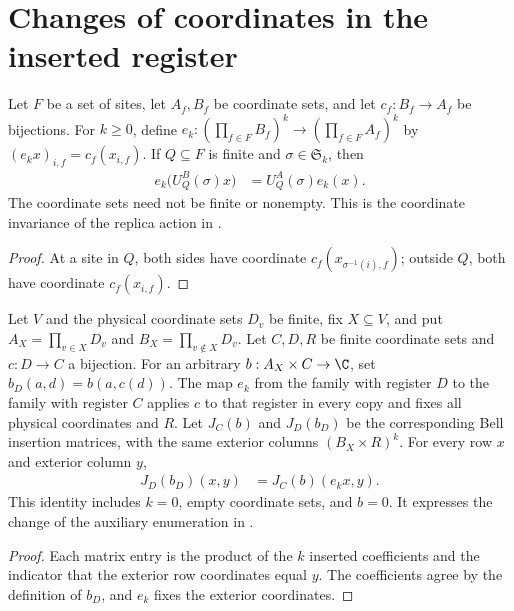 \section{Changes of coordinates in the inserted register}

\begin{theorem}
    \label{thm:subsystem_local_coordinate_change}
    \leanok
    Let $F$ be a set of sites, let $A_f,B_f$ be coordinate sets, and
    let $c_f:B_f\to A_f$ be bijections. For $k\geq0$, define
    $e_k:(\prod_{f\in F}B_f)^k\to(\prod_{f\in F}A_f)^k$ by
    $(e_kx)_{i,f}=c_f(x_{i,f})$.
    If $Q\subseteq F$ is finite and $\sigma\in\mathfrak S_k$, then
    \begin{align*}
        e_k\bigl(U_Q^B(\sigma)x\bigr)&=U_Q^A(\sigma)e_k(x).
    \end{align*}
    The coordinate sets need not be finite or nonempty.
    This is the coordinate invariance of the replica action in
    \cite[Section~6, lines~24--27]{OpenAI2026AreaLaw}.
\end{theorem}
\begin{proof}\leanok
    At a site in $Q$, both sides have coordinate
    $c_f(x_{\sigma^{-1}(i),f})$; outside $Q$, both have coordinate
    $c_f(x_{i,f})$.
\end{proof}

\begin{theorem}
    \label{thm:bell_insertion_register_coordinates}
    \leanok
    Let $V$ and the physical coordinate sets $D_v$ be finite, fix
    $X\subseteq V$, and put $A_X=\prod_{v\in X}D_v$ and
    $B_X=\prod_{v\notin X}D_v$.
    Let $C,D,R$ be finite coordinate sets and $c:D\to C$ a bijection.
    For an arbitrary $b:A_X\times C\to\C$, set $b_D(a,d)=b(a,c(d))$.
    The map $e_k$ from the family with register $D$ to the family with
    register $C$ applies $c$ to that register in every copy and fixes
    all physical coordinates and $R$.
    Let $J_C(b)$ and $J_D(b_D)$ be the corresponding Bell insertion
    matrices, with the same exterior columns $(B_X\times R)^k$.
    For every row $x$ and exterior column $y$,
    \begin{align*}
        J_D(b_D)(x,y)&=J_C(b)(e_kx,y).
    \end{align*}
    This identity includes $k=0$, empty coordinate sets, and $b=0$.
    It expresses the change of the auxiliary enumeration in
    \cite[Section~8, lines~283--308]{OpenAI2026AreaLaw}.
\end{theorem}
\begin{proof}\leanok
    Each matrix entry is the product of the $k$ inserted coefficients
    and the indicator that the exterior row coordinates equal $y$.
    The coefficients agree by the definition of $b_D$, and $e_k$
    fixes the exterior coordinates.
\end{proof}
